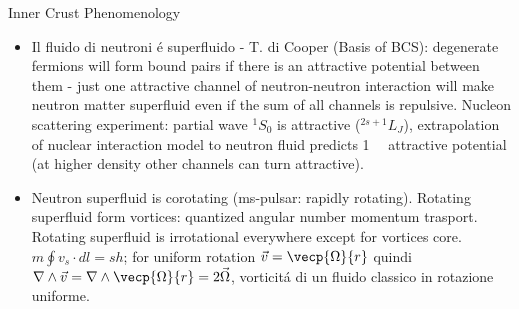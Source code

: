 \begin{frame}{Inner Crust Phenomenology}
\begin{itemize}
                \item Il fluido di neutroni \'e superfluido - T. di Cooper (Basis of BCS): degenerate fermions will form bound pairs if there is an attractive potential between them - just one attractive channel of neutron-neutron interaction will make neutron matter superfluid even if the sum of all channels is repulsive. Nucleon scattering experiment: partial wave $^1S_0$ is attractive ($^{2s+1}L_J$), extrapolation of nuclear interaction model to neutron fluid predicts \SI{1}{\mega\ev} attractive potential (at higher density other channels can turn attractive).
                \item Neutron superfluid is corotating (ms-pulsar: rapidly rotating). Rotating superfluid form vortices: quantized angular number momentum trasport.
                    Rotating superfluid is irrotational everywhere except for vortices core. $m\oint v_s\cdot dl=sh$; for uniform rotation $\vec{v}=\vecp{\Omega}{r}$ quindi $\nabla\wedge\vec{v}=\nabla\wedge\vecp{\Omega}{r}=2\vec{\Omega}$, vorticit\'a di un fluido classico in rotazione uniforme.
            \end{itemize}
\end{frame}

